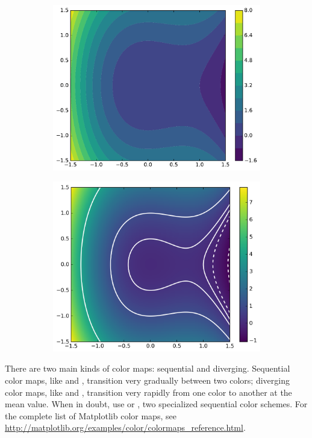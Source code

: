 \begin{figure}[H]
\begin{subfigure}{.495\textwidth}
    \centering
    \includegraphics[width=\linewidth]{figures/contour_2.pdf}
\end{subfigure}
%
\begin{subfigure}{.495\textwidth}
    \centering
    \includegraphics[width=\linewidth]{figures/heatmap_2.pdf}
\end{subfigure}
\end{figure}

There are two main kinds of color maps: sequential and diverging.
Sequential color maps, like  and , transition very gradually between two colors; diverging color maps, like  and , transition very rapidly from one color to another at the mean value.
When in doubt, use  or , two specialized sequential color schemes.
For the complete list of Matplotlib color maps, see \url{http://matplotlib.org/examples/color/colormaps_reference.html}.

